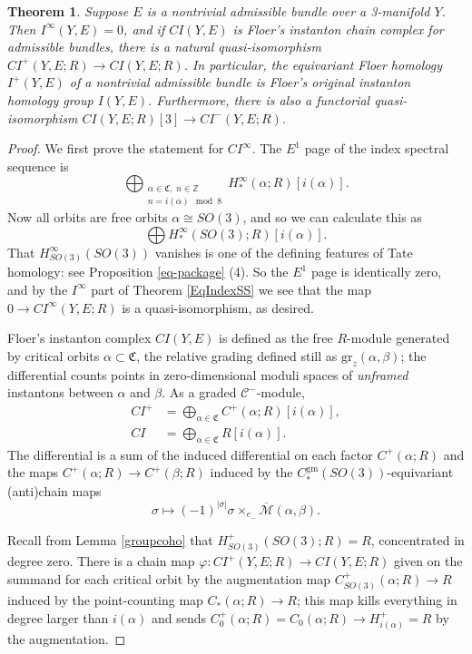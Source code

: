 \documentclass{memo-l}
\newtheorem{theorem}{Theorem}[chapter]
\theoremstyle{definition}
\theoremstyle{remark}
\numberwithin{section}{chapter}
\numberwithin{equation}{chapter}
\begin{document}
\begin{theorem}\label{admissible-iso}Suppose $E$ is a nontrivial admissible bundle over a 3-manifold $Y$. Then $I^\infty(Y, E) = 0$, and if $CI(Y, E)$ is Floer's instanton chain complex for admissible bundles, there is a natural quasi-isomorphism $CI^+(Y, E;R) \to CI(Y, E;R)$. In particular, the equivariant Floer homology $I^+(Y, E)$ of a nontrivial admissible bundle is Floer's original instanton homology group $I(Y, E)$. Furthermore, there is also a functorial quasi-isomorphism $CI(Y, E;R)[3] \to CI^-(Y, E;R)$. 
\end{theorem}
\begin{proof}We first prove the statement for $CI^\infty$. The $E^1$ page of the index spectral sequence is $$\bigoplus_{\substack{\alpha \in \mathfrak C, \;n \in \mathbb Z \\ n = i(\alpha) \!\!\!\mod 8}} H^\infty_{*}(\alpha;R)[i(\alpha)].$$ Now all orbits are free orbits $\alpha \cong SO(3)$, and so we can calculate this as $$\bigoplus H^\infty_{*}(SO(3);R)[i(\alpha)].$$ That $H^\infty_{SO(3)}(SO(3))$ vanishes is one of the defining features of Tate homology: see Proposition \ref{eq-package} (4). So the $E^1$ page is identically zero, and by the $I^\infty$ part of Theorem \ref{EqIndexSS} we see that the map $0 \to CI^\infty(Y, E;R)$ is a quasi-isomorphism, as desired.

Floer's instanton complex $CI(Y, E)$ is defined as the free $R$-module generated by critical orbits $\alpha \subset \mathfrak C$, the relative grading defined still as $\text{gr}_z(\alpha, \beta)$; the differential counts points in zero-dimensional moduli spaces of \textit{unframed} instantons between $\alpha$ and $\beta$. As a graded $\mathcal C^-$-module, 
\begin{align*}CI^+ &= \bigoplus_{\alpha \in \mathfrak C} C^+(\alpha;R)[i(\alpha)],\\
CI &= \bigoplus_{\alpha \in \mathfrak C} R[i(\alpha)].\end{align*}
The differential is a sum of the induced differential on each factor $C^+(\alpha;R)$ and the maps $C^+(\alpha;R) \to C^+(\beta;R)$ induced by the $C^\text{gm}_*(SO(3))$-equivariant (anti)chain maps $$\sigma \mapsto (-1)^{|\sigma|} \sigma \times_{e_-} \overline{\mathcal M}(\alpha, \beta).$$ 

Recall from Lemma \ref{groupcoho} that $H_{SO(3)}^+(SO(3);R) = R$, concentrated in degree zero. There is a chain map $\varphi: CI^+(Y, E;R) \to CI(Y, E;R)$ given on the summand for each critical orbit by the augmentation map $C^+_{SO(3)}(\alpha;R) \to R$ induced by the point-counting map $C_*(\alpha;R) \to R$; this map kills everything in degree larger than $i(\alpha)$ and sends $C^+_0(\alpha;R) = C_0(\alpha;R) \to H^+_{i(\alpha)} = R$ by the augmentation. 


\end{proof}
\end{document}
